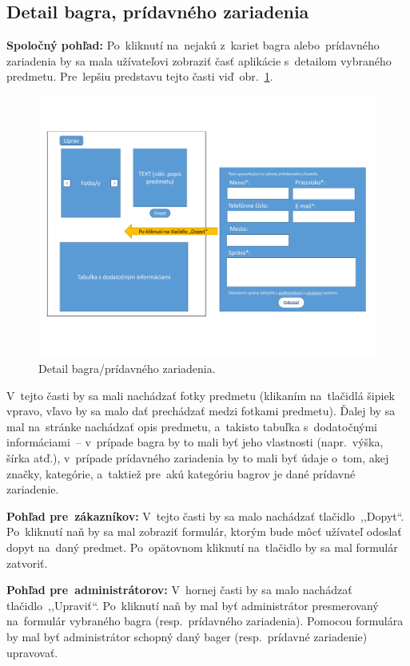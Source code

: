 \subsection{Detail bagra, prídavného zariadenia}
\label{detail bagra pridavneho zariadenia}

\textbf{Spoločný pohľad:} Po~kliknutí na~nejakú z~kariet bagra alebo~prídavného zariadenia by sa mala užívateľovi zobraziť časť aplikácie s~detailom vybraného predmetu. Pre~lepšiu predstavu tejto časti viď~obr.~\ref{detail}.

\begin{figure}[H]\centering
\includegraphics[width=140mm]{../img/UI concept/detail}
\caption{Detail bagra/prídavného zariadenia.}
\label{detail}
\end{figure}

V~tejto časti by sa mali nachádzať fotky predmetu (klikaním na~tlačidlá šipiek vpravo, vľavo by sa malo dať prechádzať medzi fotkami predmetu). Ďalej by sa mal na~stránke nachádzať opis predmetu, a~takisto tabuľka s~dodatočnými informáciami~-- v~prípade bagra by to mali byť jeho vlastnosti (napr.~výška, šírka atď.), v~prípade prídavného zariadenia by to mali byť údaje o~tom, akej značky, kategórie, a~taktiež pre~akú kategóriu bagrov je dané prídavné zariadenie.

\textbf{Pohľad pre~zákazníkov:} V~tejto časti by sa malo nachádzať tlačidlo~,,Dopyt``. Po~kliknutí naň by sa mal zobraziť formulár, ktorým bude môcť užívateľ odoslať dopyt na~daný predmet. Po~opätovnom kliknutí na~tlačidlo by sa mal formulár zatvoriť.

\textbf{Pohľad pre~administrátorov:} V~hornej časti by sa malo nachádzať tlačidlo~,,Upraviť``. Po~kliknutí naň by mal byť administrátor presmerovaný na~formulár vybraného bagra (resp.~prídavného zariadenia). Pomocou formulára by mal byť administrátor schopný daný bager (resp.~prídavné zariadenie) upravovať.
\newpage
